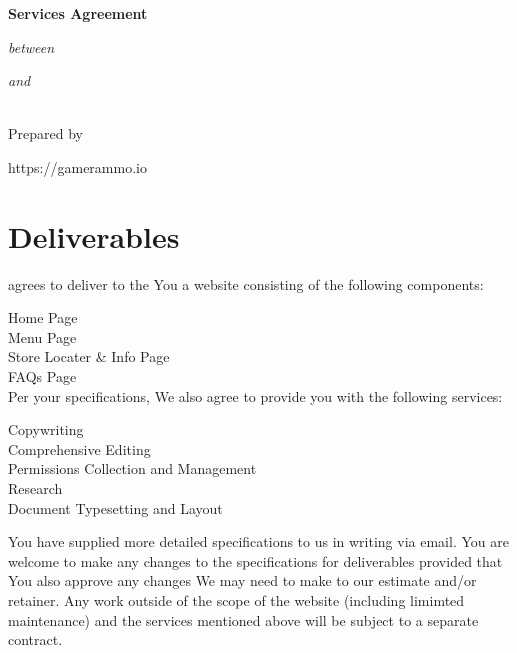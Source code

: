 \documentclass[usletter,11pt]{article} %
\makeatletter
\renewcommand{\companyname}{} %
\renewcommand{\preparer}{} %
\renewcommand{\companyaddress}{} %
\renewcommand{\companyphone}{} %
\renewcommand{\companyemail}{} %
\renewcommand{\clientbusinessname}{[Client's Business Name]} %
\renewcommand{\clientname}{}  %
\makeatother
\begin{document}
\vspace*{\fill} %

\begin{center}

{\huge \textbf{Services Agreement}}

\small\textit{{between}}

{\Large \companyname}

\small\textit{{and}}

{\LARGE\textbf{\clientname}}\\

\vspace{5ex}
Prepared by\\
\vspace{2ex}
\preparer
\vspace{2ex}

\companyaddress

\companyphone

\companyemail

https://gamerammo.io

\end{center}

\vspace*{\fill} %

\newpage

{\deliverables}{
\section{Deliverables}

\ludu agrees to deliver to the You a website consisting of the following components:

Home Page\\
Menu Page\\
Store Locater \& Info Page\\
FAQs Page\\

Per your specifications, We also agree to provide you with the following services:

Copywriting\\
Comprehensive Editing\\
Permissions Collection and Management\\
Research\\
\latex Document Typesetting and Layout

You have supplied more detailed specifications to us in writing via email. You are welcome to make any changes to the specifications for deliverables provided that You also approve any changes We may need to make to our estimate and/or retainer. Any work outside of the scope of the website (including limimted maintenance) and the services mentioned above will be subject to a separate contract.
}
\end{document}
